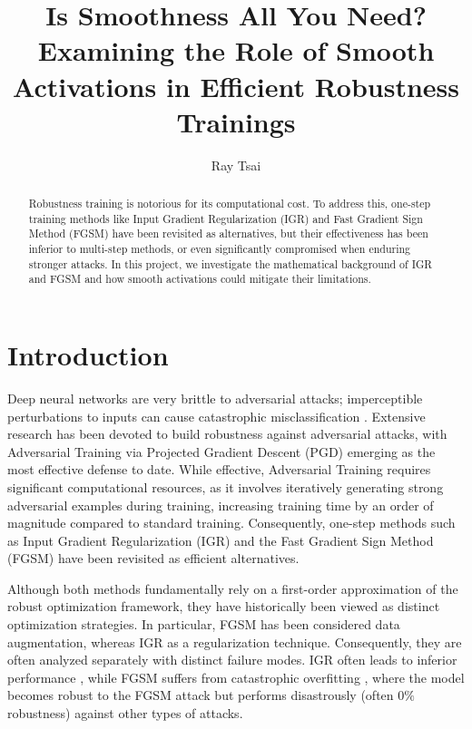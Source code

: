 \documentclass{article}
\title{Is Smoothness All You Need? Examining the Role of Smooth Activations in Efficient Robustness Trainings}
\author{%
  Ray Tsai
}
\begin{document}

\maketitle

\begin{abstract}
  Robustness training is notorious for its computational cost. To address this, one-step training methods like Input Gradient Regularization (IGR) and Fast Gradient Sign Method (FGSM) have been revisited as alternatives, but their effectiveness has been inferior to multi-step methods, or even significantly compromised when enduring stronger attacks. In this project, we investigate the mathematical background of IGR and FGSM and how smooth activations could mitigate their limitations.
\end{abstract}

\section{Introduction}

Deep neural networks are very brittle to adversarial attacks; imperceptible perturbations to inputs can cause catastrophic misclassification \cite{szegedy2014intriguingpropertiesneuralnetworks}. Extensive research has been devoted to build robustness against adversarial attacks, with Adversarial Training via Projected Gradient Descent (PGD) \cite{madry2019deeplearningmodelsresistant} emerging as the most effective defense to date. While effective, Adversarial Training requires significant computational resources, as it involves iteratively generating strong adversarial examples during training, increasing training time by an order of magnitude compared to standard training. Consequently, one-step methods such as Input Gradient Regularization (IGR) and the Fast Gradient Sign Method (FGSM) have been revisited as efficient alternatives. 

Although both methods fundamentally rely on a first-order approximation of the robust optimization framework, they have historically been viewed as distinct optimization strategies. In particular, FGSM has been considered data augmentation, whereas IGR as a regularization technique. Consequently, they are often analyzed separately with distinct failure modes. IGR often leads to inferior performance \cite{ross2017improvingadversarialrobustnessinterpretability, seck2019l1normdoublebackpropagation, papernot2017practicalblackboxattacksmachine}, while FGSM suffers from catastrophic overfitting \cite{kang2021understandingcatastrophicoverfittingadversarial}, where the model becomes robust to the FGSM attack but performs disastrously (often $0\%$ robustness) against other types of attacks.
\end{document}
